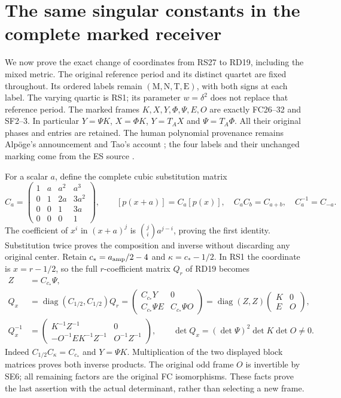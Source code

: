 \documentclass[11pt]{article}
\newcommand{\C}{\mathbb C}
\begin{document}
\section{The same singular constants in the complete marked receiver}
We now prove the exact change of coordinates from RS27 to RD19,
including the mixed metric. The original reference period and its
distinct quartet are fixed throughout. Its ordered labels remain
$(\mathrm M,\mathrm N,\mathrm T,\mathrm E)$, with both signs at
each label. The varying quartic is RS1; its parameter $w=\delta^2$
does not replace that reference period. The marked frames
$K,X,Y,\Phi,\Psi,E,O$ are exactly FC26--32 and SF2--3.
In particular $Y=\Psi K$, $X=\Phi K$, $Y=T_AX$ and
$\Psi=T_A\Phi$. All their original phases and entries are retained.
The human polynomial provenance remains Alp\"oge's announcement
and Tao's account \cite{Tao}; the four labels and their unchanged
marking come from the ES source \cite{ES488}.

For a scalar $a$, define the complete cubic substitution matrix
\begin{equation}
 C_a=\begin{pmatrix}1&a&a^2&a^3\\0&1&2a&3a^2\\
 0&0&1&3a\\0&0&0&1\end{pmatrix},\qquad
 [p(x+a)]=C_a[p(x)],\quad C_aC_b=C_{a+b},\quad C_a^{-1}=C_{-a}.
 \tag{MR1}
\end{equation}
The coefficient of $x^i$ in $(x+a)^j$ is
$\binom ji a^{j-i}$, proving the first identity. Substitution
twice proves the composition and inverse without discarding
any original center. Retain $c_*=a_{\rm amp}/2-4$ and
$\kappa=c_*-1/2$. In RS1 the coordinate is $x=r-1/2$, so
the full $r$-coefficient matrix $Q_r$ of RD19 becomes
\begin{equation}
 \begin{split}
 Z&=C_{c_*}\Psi,\\
 Q_x&=\operatorname{diag}(C_{1/2},C_{1/2})Q_r
   =\begin{pmatrix}C_{c_*}Y&0\\C_{c_*}\Psi E&C_{c_*}\Psi O\end{pmatrix}
   =\operatorname{diag}(Z,Z)\begin{pmatrix}K&0\\E&O\end{pmatrix},\\
 Q_x^{-1}&=\begin{pmatrix}
 K^{-1}Z^{-1}&0\\-O^{-1}EK^{-1}Z^{-1}&O^{-1}Z^{-1}
 \end{pmatrix},\qquad
 \det Q_x=(\det\Psi)^2\det K\det O\ne0.
 \end{split}\tag{MR2}
\end{equation}
Indeed $C_{1/2}C_\kappa=C_{c_*}$ and $Y=\Psi K$.
Multiplication of the two displayed block matrices proves
both inverse products. The original odd frame $O$ is
invertible by SE6; all remaining factors are the original
FC isomorphisms. These facts prove the last assertion with
the actual determinant, rather than selecting a new frame.
\end{document}
